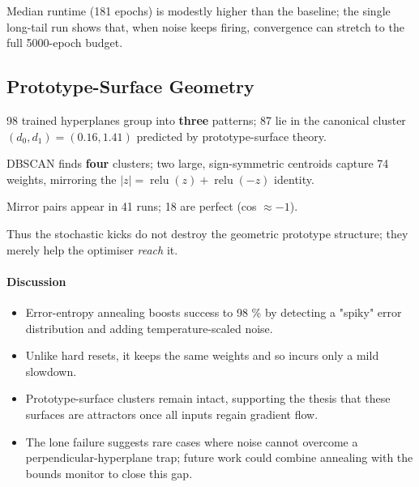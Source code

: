 Median runtime (181 epochs) is modestly higher than the baseline; the
single long-tail run shows that, when noise keeps firing, convergence
can stretch to the full 5000-epoch budget.

\subsection*{Prototype-Surface Geometry}

\begin{description}[leftmargin=2em]
  \item[Distance clusters]
        98 trained hyperplanes group into \textbf{three} patterns;  
        87 lie in the canonical cluster
        \((d_{0},d_{1})\!=\!(0.16,1.41)\) predicted by prototype-surface
        theory.%
  \item[Weight clusters]
        DBSCAN finds \textbf{four} clusters; two large, sign-symmetric
        centroids capture 74 weights, mirroring the
        $|z|=\operatorname{relu}(z)+\operatorname{relu}(-z)$ identity.%
  \item[Mirror symmetry]
        Mirror pairs appear in 41 runs; 18 are perfect (cos $\approx -1$).%
\end{description}

Thus the stochastic kicks do not destroy the geometric prototype
structure; they merely help the optimiser \emph{reach} it.

\paragraph{Discussion}
\begin{itemize}
  \item Error-entropy annealing boosts success to 98 \% by detecting a
        "spiky" error distribution and adding temperature-scaled noise.
  \item Unlike hard resets, it keeps the same weights and so incurs only
        a mild slowdown.
  \item Prototype-surface clusters remain intact, supporting the thesis
        that these surfaces are attractors once all inputs regain
        gradient flow.
  \item The lone failure suggests rare cases where noise cannot overcome
        a perpendicular-hyperplane trap; future work could combine
        annealing with the bounds monitor to close this gap.
\end{itemize}

\hrulefill
